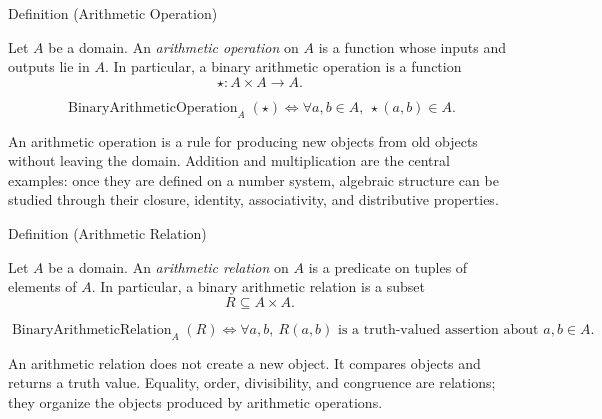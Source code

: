 \begin{definitionbox}{Definition (Arithmetic Operation)}
\begin{definition}
\label{def:arithmetic-operation}
Let $A$ be a domain. An \emph{arithmetic operation} on $A$ is a function
whose inputs and outputs lie in $A$. In particular, a binary arithmetic
operation is a function
\[
\star : A \times A \to A.
\]
\end{definition}

\begin{remark*}
\[
\operatorname{BinaryArithmeticOperation}_A(\star)
\Longleftrightarrow
\forall a,b \in A,\ \star(a,b) \in A.
\]
\end{remark*}

\begin{remark*}[Interpretation]
An arithmetic operation is a rule for producing new objects from old objects
without leaving the domain. Addition and multiplication are the central
examples: once they are defined on a number system, algebraic structure can be
studied through their closure, identity, associativity, and distributive
properties.
\end{remark*}

\NoLocalDependencies
\end{definitionbox}

\begin{definitionbox}{Definition (Arithmetic Relation)}
\begin{definition}
\label{def:arithmetic-relation}
Let $A$ be a domain. An \emph{arithmetic relation} on $A$ is a predicate on
tuples of elements of $A$. In particular, a binary arithmetic relation is a
subset
\[
R \subseteq A \times A.
\]
\end{definition}

\begin{remark*}
\[
\operatorname{BinaryArithmeticRelation}_A(R)
\Longleftrightarrow
\forall a,b,\ R(a,b) \text{ is a truth-valued assertion about } a,b \in A.
\]
\end{remark*}

\begin{remark*}[Interpretation]
An arithmetic relation does not create a new object. It compares objects and
returns a truth value. Equality, order, divisibility, and congruence are
relations; they organize the objects produced by arithmetic operations.
\end{remark*}

\NoLocalDependencies
\end{definitionbox}

